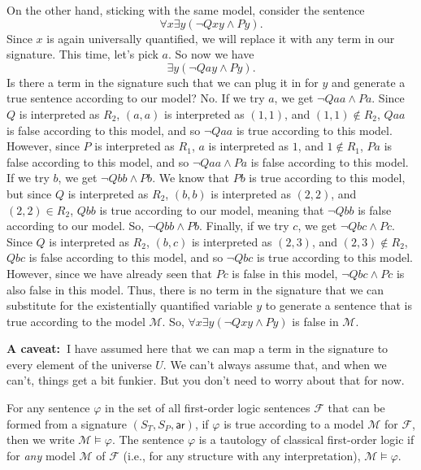 \documentclass[11pt]{article}
\theoremstyle{definition}
\theoremstyle{remark}
\begin{document}
On the other hand, sticking with the same model, consider the sentence $$\forall x \exists y (\neg Qxy \wedge Py).$$ Since $x$ is again universally quantified, we will replace it with any term in our signature. This time, let's pick $a$. So now we have
$$\exists y (\neg Qay \wedge Py).$$ Is there a term in the signature such that we can plug it in for $y$ and generate a true sentence according to our model? No. If we try $a$, we get $\neg Qaa \wedge Pa$. Since $Q$ is interpreted as $R_{2}$, $(a,a)$ is interpreted as $(1,1)$, and $(1,1)\not\in R_{2}$, $Qaa$ is false according to this model, and so $\neg Qaa$ is true according to this model. However, since $P$ is interpreted as $R_{1}$, $a$ is interpreted as $1$, and $1\not\in R_{1}$, $Pa$ is false according to this model, and so $\neg Qaa \wedge Pa$ is false according to this model. If we try $b$, we get $\neg Qbb \wedge Pb$. We know that $Pb$ is true according to this model, but since $Q$ is interpreted as $R_{2}$, $(b,b)$ is interpreted as $(2,2)$, and $(2,2)\in R_{2}$, $Qbb$ is true according to our model, meaning that $\neg Qbb$ is false according to our model. So, $\neg Qbb \wedge Pb$. Finally, if we try $c$, we get $\neg Qbc \wedge Pc$. Since $Q$ is interpreted as $R_{2}$, $(b,c)$ is interpreted as $(2,3)$, and $(2,3)\not\in R_{2}$, $Qbc$ is false according to this model, and so $\neg Qbc$ is true according to this model. However, since we have already seen that $Pc$ is false in this model, $\neg Qbc \wedge Pc$ is also false in this model. Thus, there is no term in the signature that we can substitute for the existentially quantified variable $y$ to generate a sentence that is true according to the model $\mathcal{M}$. So, $\forall x \exists y (\neg Qxy \wedge Py)$ is false in $\mathcal{M}$.\par 


\textbf{A caveat:\ }I have assumed here that we can map a term in the signature to every element of the universe $U$. We can't always assume that, and when we can't, things get a bit funkier. But you don't need to worry about that for now.


For any sentence $\varphi$ in the set of all first-order logic sentences $\mathcal{F}$ that can be formed from a signature $(S_{T},S_{P},\textsf{ar})$, if $\varphi$ is true according to a model $\mathcal{M}$ for $\mathcal{F}$, then we write $\mathcal{M}\vDash\varphi$. The sentence $\varphi$ is a tautology of classical first-order logic if for \textit{any} model $\mathcal{M}$ of $\mathcal{F}$ (i.e., for any structure with any interpretation), $\mathcal{M}\vDash\varphi$. 
\end{document}
